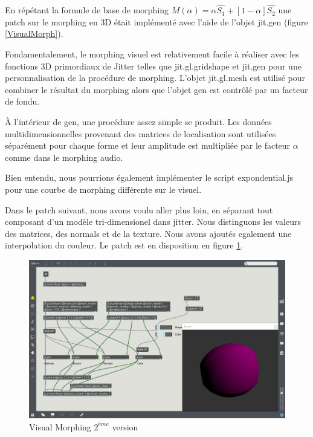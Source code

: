 En répétant la formule de base de morphing $M(\alpha) = \alpha\widehat {S_1} + [1 -\alpha]\widehat {S_2} $ une patch sur le morphing en 3D était implémenté avec l'aide de l'objet jit.gen (figure \ref{VisualMorph}).

Fondamentalement, le morphing visuel est relativement facile à réaliser avec les fonctions 3D primordiaux de Jitter telles que jit.gl.gridshape et jit.gen pour une personnalisation de la procédure de morphing. L'objet jit.gl.mesh est utilisé pour combiner le résultat du morphing alors que l'objet gen est contrôlé par un facteur de fondu.

À l'intérieur de gen, une procédure assez simple se produit. Les données multidimensionnelles provenant des matrices de localisation sont utilisées séparément pour chaque forme et leur amplitude est multipliée par le facteur $\alpha$ comme dans le morphing audio.

Bien entendu, nous pourrions également implémenter le script expondential.js pour une courbe de morphing différente sur le visuel.

Dans le patch suivant, nous avons voulu aller plus loin, en séparant tout composant d'un modèle tri-dimensionel dans jitter. Nous distinguons les valeurs des matrices, des normals et de la texture. Nous avons ajoutés egalement une interpolation du couleur. Le patch est en disposition en figure \ref{VisualMorph2}.

    \begin{figure}
        \centering
        \includegraphics[width = \textwidth ]{Graphs/ShapeMorphing1.png}
        \caption{Visual Morphing $2^{ème}$ version}
        \label{VisualMorph2}
    \end{figure} 

